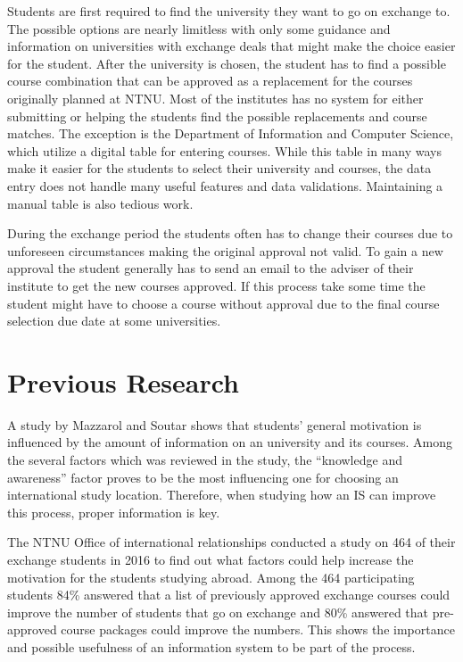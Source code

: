 Students are first required to find the university they want to go on exchange to. The possible options are nearly limitless with only some guidance and information on universities with exchange deals that might make the choice easier for the student. After the university is chosen, the student has to find a possible course combination that can be approved as a replacement for the courses originally planned at NTNU. Most of the institutes has no system for either submitting or helping the students find the possible replacements and course matches. The exception is the Department of Information and Computer Science, which utilize a digital table for entering courses. While this table in many ways make it easier for the students to select their university and courses, the data entry does not handle many useful features and data validations. Maintaining a manual table is also tedious work. 

During the exchange period the students often has to change their courses due to unforeseen circumstances making the original approval not valid. To gain a new approval the student generally has to send an email to the adviser of their institute to get the new courses approved. If this process take some time the student might have to choose a course without approval due to the final course selection due date at some universities. 

\section{Previous Research}

A study by Mazzarol and Soutar\cite{mazzarol2002push} shows that students' general motivation is influenced by the amount of information on an university and its courses. Among the several factors which was reviewed in the study, the \enquote{knowledge and awareness} factor proves to be the most influencing one for choosing an international study location. Therefore, when studying how an IS can improve this process, proper information is key. 

The NTNU Office of international relationships conducted a study on 464 of their exchange students in 2016 to find out what factors could help increase the motivation for the students studying abroad. Among the 464 participating students 84\% answered that a list of previously approved exchange courses could improve the number of students that go on exchange and 80\% answered that pre-approved course packages could improve the numbers. This shows the importance and possible usefulness of an information system to be part of the process. 

